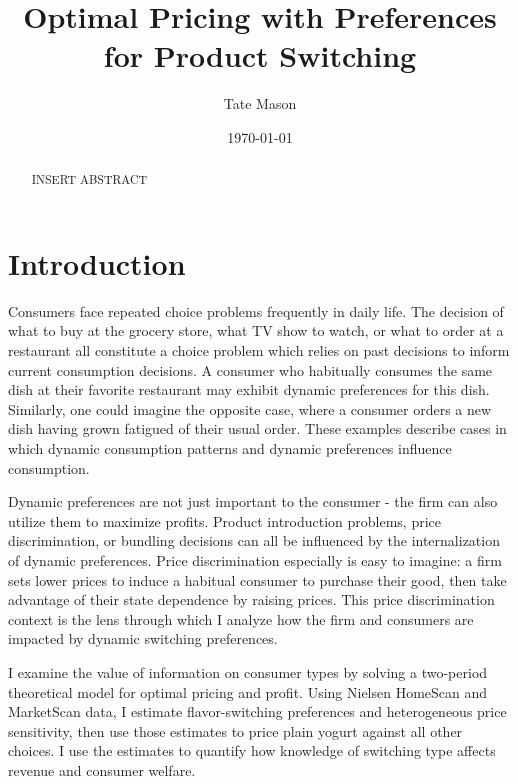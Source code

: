 \documentclass[12pt]{article}
\title{Optimal Pricing with Preferences for Product Switching}
\author{Tate Mason}
\date{\today}
\theoremstyle{definition}
\theoremstyle{remark}
\begin{document}
\maketitle

\begin{abstract}
  INSERT ABSTRACT
\end{abstract}

\newpage


\section{Introduction}
\label{sec:introduction}

Consumers face repeated choice problems frequently in daily life. The decision of what to buy at the grocery store, what TV show to watch, or what to order at a restaurant all constitute a choice problem which relies on past decisions to inform current consumption decisions. A consumer who habitually consumes the same dish at their favorite restaurant may exhibit dynamic preferences for this dish. Similarly, one could imagine the opposite case, where a consumer orders a new dish having grown fatigued of their usual order. These examples describe cases in which dynamic consumption patterns and dynamic preferences influence consumption.

Dynamic preferences are not just important to the consumer - the firm can also utilize them to maximize profits. Product introduction problems, price discrimination, or bundling decisions can all be influenced by the internalization of dynamic preferences. Price discrimination especially is easy to imagine: a firm sets lower prices to induce a habitual consumer to purchase their good, then take advantage of their state dependence by raising prices. This price discrimination context is the lens through which I analyze how the firm and consumers are impacted by dynamic switching preferences.

I examine the value of information on consumer types by solving a two-period theoretical model for optimal pricing and profit. Using Nielsen HomeScan and MarketScan data, I estimate flavor-switching preferences and heterogeneous price sensitivity, then use those estimates to price plain yogurt against all other choices. I use the estimates to quantify how knowledge of switching type affects revenue and consumer welfare.
\end{document}
